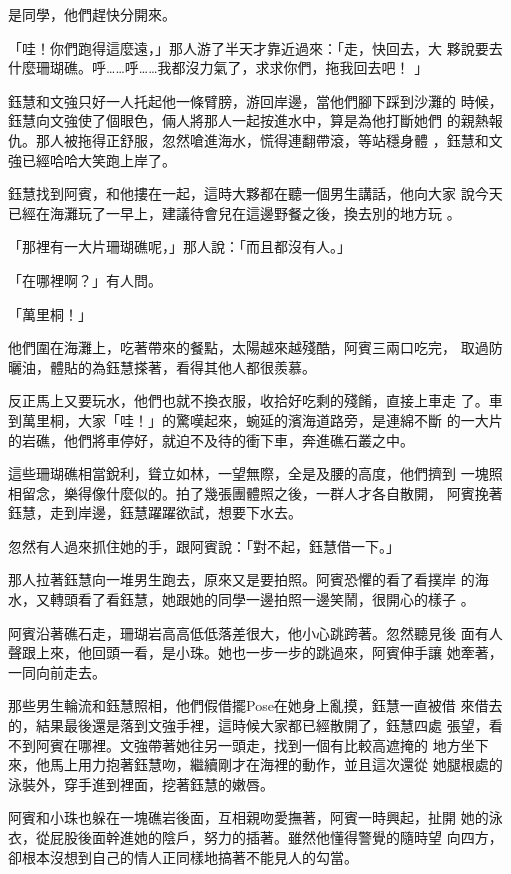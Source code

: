 是同學，他們趕快分開來。

「哇！你們跑得這麼遠，」那人游了半天才靠近過來：「走，快回去，大
夥說要去什麼珊瑚礁。呼……呼……我都沒力氣了，求求你們，拖我回去吧！
」

鈺慧和文強只好一人托起他一條臂膀，游回岸邊，當他們腳下踩到沙灘的
時候，鈺慧向文強使了個眼色，倆人將那人一起按進水中，算是為他打斷她們
的親熱報仇。那人被拖得正舒服，忽然嗆進海水，慌得連翻帶滾，等站穩身體
，鈺慧和文強已經哈哈大笑跑上岸了。

鈺慧找到阿賓，和他摟在一起，這時大夥都在聽一個男生講話，他向大家
說今天已經在海灘玩了一早上，建議待會兒在這邊野餐之後，換去別的地方玩
。

「那裡有一大片珊瑚礁呢，」那人說：「而且都沒有人。」

「在哪裡啊？」有人問。

「萬里桐！」

他們圍在海灘上，吃著帶來的餐點，太陽越來越殘酷，阿賓三兩口吃完，
取過防曬油，體貼的為鈺慧搽著，看得其他人都很羨慕。

反正馬上又要玩水，他們也就不換衣服，收拾好吃剩的殘餚，直接上車走
了。車到萬里桐，大家「哇！」的驚嘆起來，蜿延的濱海道路旁，是連綿不斷
的一大片的岩礁，他們將車停好，就迫不及待的衝下車，奔進礁石叢之中。

這些珊瑚礁相當銳利，聳立如林，一望無際，全是及腰的高度，他們擠到
一塊照相留念，樂得像什麼似的。拍了幾張團體照之後，一群人才各自散開，
阿賓挽著鈺慧，走到岸邊，鈺慧躍躍欲試，想要下水去。

忽然有人過來抓住她的手，跟阿賓說：「對不起，鈺慧借一下。」

那人拉著鈺慧向一堆男生跑去，原來又是要拍照。阿賓恐懼的看了看撲岸
的海水，又轉頭看了看鈺慧，她跟她的同學一邊拍照一邊笑鬧，很開心的樣子
。

阿賓沿著礁石走，珊瑚岩高高低低落差很大，他小心跳跨著。忽然聽見後
面有人聲跟上來，他回頭一看，是小珠。她也一步一步的跳過來，阿賓伸手讓
她牽著，一同向前走去。

那些男生輪流和鈺慧照相，他們假借擺Pose在她身上亂摸，鈺慧一直被借
來借去的，結果最後還是落到文強手裡，這時候大家都已經散開了，鈺慧四處
張望，看不到阿賓在哪裡。文強帶著她往另一頭走，找到一個有比較高遮掩的
地方坐下來，他馬上用力抱著鈺慧吻，繼續剛才在海裡的動作，並且這次還從
她腿根處的泳裝外，穿手進到裡面，挖著鈺慧的嫩唇。

阿賓和小珠也躲在一塊礁岩後面，互相親吻愛撫著，阿賓一時興起，扯開
她的泳衣，從屁股後面幹進她的陰戶，努力的插著。雖然他懂得警覺的隨時望
向四方，卻根本沒想到自己的情人正同樣地搞著不能見人的勾當。

